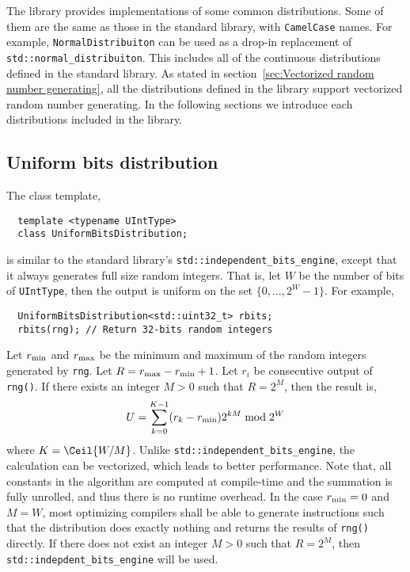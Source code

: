 The library provides implementations of some common distributions. Some of them
are the same as those in the standard library, with \verb|CamelCase| names. For
example, \verb|NormalDistribuiton| can be used as a drop-in replacement of
\verb|std::normal_distribuiton|. This includes all of the continuous
distributions defined in the standard library. As stated in
section~\ref{sec:Vectorized random number generating}, all the distributions
defined in the library support vectorized random number generating. In the
following sections we introduce each distributions included in the library.

\subsection{Uniform bits distribution}
\label{sub:Uniform bits distribution}

The class template,
\begin{Verbatim}
  template <typename UIntType>
  class UniformBitsDistribution;
\end{Verbatim}
is similar to the standard library's \verb|std::independent_bits_engine|,
except that it always generates full size random integers. That is, let $W$ be
the number of bits of \verb|UIntType|, then the output is uniform on the set
$\{0,\dots,2^W - 1\}$. For example,
\begin{Verbatim}
  UniformBitsDistribution<std::uint32_t> rbits;
  rbits(rng); // Return 32-bits random integers
\end{Verbatim}
Let $r_{\mathrm{min}}$ and $r_{\mathrm{max}}$ be the minimum and maximum of the random integers
generated by \verb|rng|. Let $R = r_{\mathrm{max}} - r_{\mathrm{min}} + 1$. Let $r_i$ be consecutive
output of \verb|rng()|. If there exists an integer $M > 0$ such that $R = 2^M$,
then the result is,
\begin{equation*}
  U = \sum_{k = 0}^{K - 1} (r_k - r_{\mathrm{min}}) 2^{kM} \bmod 2^W
\end{equation*}
where $K = \Ceil{W / M}$. Unlike \verb|std::independent_bits_engine|, the
calculation can be vectorized, which leads to better performance. Note that,
all constants in the algorithm are computed at compile-time and the summation
is fully unrolled, and thus there is no runtime overhead. In the case $r_{\mathrm{min}} =
0$ and $M = W$, most optimizing compilers shall be able to generate
instructions such that the distribution does exactly nothing and returns the
results of \verb|rng()| directly. If there does not exist an integer $M > 0$
such that $R = 2^M$, then \verb|std::indepdent_bits_engine| will be used.

